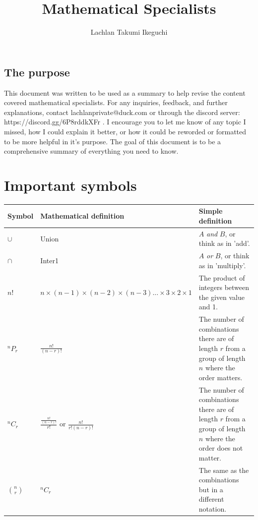 \documentclass{book}
\title{Mathematical Specialists}
\author{Lachlan Takumi Ikeguchi}
\begin{document}
\maketitle
\tableofcontents

\section{The purpose}
This document was written to be used as a summary to help revise the content covered mathematical specialists.  For any inquiries, feedback, and further explanations, contact lachlanprivate@duck.com or through the discord server: https://discord.gg/6P8rddkXFr .  I encourage you to let me know of any topic I missed, how I could explain it better, or how it could be reworded or formatted to be more helpful in it's purpose.  The goal of this document is to be a comprehensive summary of everything you need to know.

\chapter{Important symbols}
\begin{center}
	\begin{tabular}{l|lp{6cm}}
		Symbol         & Mathematical definition                                                  & Simple definition                                                                                              \\ \hline
		$\cup$         & Union                                                                    & $A$ \emph{and} $B$, or think as in 'add'.                                                                      \\
		$\cap$         & Inter1                                                                   & $A$ \emph{or} $B$, or think as in 'multiply'.                                                                  \\
		$n!$           & $n \times (n-1) \times (n-2) \times (n-3)... \times 3 \times 2 \times 1$ & The product of integers between the given value and 1.                                                         \\
		$^nP_r$        & $\frac{n!}{(n-r)!}$                                                      & The number of combinations there are of length $r$ from a group of length $n$ where the order matters.         \\
		$^nC_r$        & $\frac{\frac{n!}{(n-r)!}}{r!}$ or $\frac{n!}{r!(n - r)!}$                & The number of combinations there are of length $r$ from a group of length $n$ where the order does not matter. \\
		$\binom{n}{r}$ & $^nC_r$                                                                  & The same as the combinations but in a different notation.
	\end{tabular}
\end{center}
\end{document}
